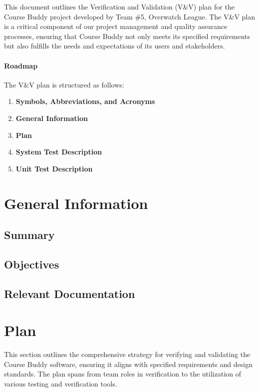 \documentclass[12pt, titlepage]{article}
\begin{document}

This document outlines the Verification and Validation (V\&V) plan for the Course Buddy project developed by Team \#5, Overwatch League. The V\&V plan is a critical component of our project management and quality assurance processes, ensuring that Course Buddy not only meets its specified requirements but also fulfills the needs and expectations of its users and stakeholders.

\paragraph{Roadmap}
The V\&V plan is structured as follows:
\begin{enumerate}
    \item \textbf{Symbols, Abbreviations, and Acronyms}
    \item \textbf{General Information}
    \item \textbf{Plan} 
    \item \textbf{System Test Description} 
    \item \textbf{Unit Test Description}
\end{enumerate}
\section{General Information}

\subsection{Summary}



\subsection{Objectives}




\subsection{Relevant Documentation}



\citet{SRS}



\section{Plan}

This section outlines the comprehensive strategy for verifying and validating the Course Buddy software, ensuring it aligns with specified requirements and design standards. The plan spans from team roles in verification to the utilization of various testing and verification tools.
\end{document}
